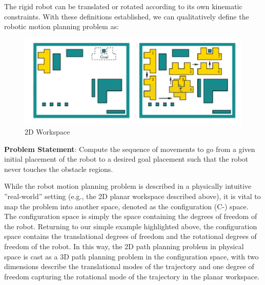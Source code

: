 \documentclass[twoside]{article}
\begin{document}
The rigid robot can be translated or rotated according to its own kinematic constraints. With these definitions established, we can qualitatively define the robotic motion planning problem as:

\begin{figure}[h]
\begin{center}
\includegraphics{fig15_1.PNG}
\caption{2D Workspace}
\end{center}
\end{figure}

\textbf{Problem Statement}: Compute the sequence of movements to go from a given initial placement of the robot to a desired goal placement such that the robot never touches the obstacle regions.

While the robot motion planning problem is described in a physically intuitive ”real-world” setting (e.g., the 2D planar workspace described above), it is vital to map the problem into another space, denoted as the configuration (C-) space. The configuration space is simply the space containing the degrees of freedom of the robot. Returning to our simple example highlighted above, the configuration space contains
the translational degrees of freedom and the rotational degrees of freedom of the robot. In this way, the 2D path planning problem in physical space is cast as a 3D path planning problem in the configuration space, with two dimensions describe the translational modes of the trajectory and one degree of freedom capturing the rotational mode of the trajectory in the planar workspace.
\end{document}
